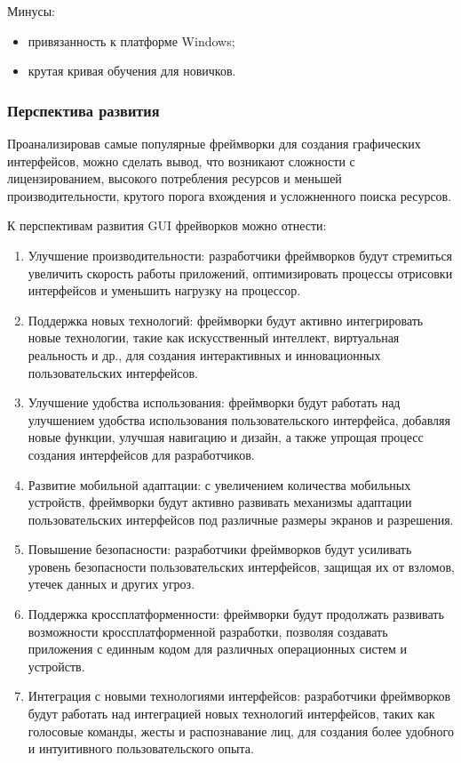 Минусы:
\begin{itemize}
\item привязанность к платформе Windows;
\item крутая кривая обучения для новичков.
\end{itemize}

\subsubsection {Перспектива развития}
Проанализировав самые популярные фреймворки для создания графических интерфейсов, можно сделать вывод, что возникают сложности с лицензированием, высокого потребления ресурсов и меньшей производительности, крутого порога вхождения и усложненного поиска ресурсов.

К перспективам развития GUI фрейворков можно отнести:
\begin{enumerate}
\item Улучшение производительности: разработчики фреймворков будут стремиться увеличить скорость работы приложений, оптимизировать процессы отрисовки интерфейсов и уменьшить нагрузку на процессор.
\item Поддержка новых технологий: фреймворки будут активно интегрировать новые технологии, такие как искусственный интеллект, виртуальная реальность и др., для создания интерактивных и инновационных пользовательских интерфейсов.
\item Улучшение удобства использования: фреймворки будут работать над улучшением удобства использования пользовательского интерфейса, добавляя новые функции, улучшая навигацию и дизайн, а также упрощая процесс создания интерфейсов для разработчиков.
\item Развитие мобильной адаптации: с увеличением количества мобильных устройств, фреймворки будут активно развивать механизмы адаптации пользовательских интерфейсов под различные размеры экранов и разрешения.
\item Повышение безопасности: разработчики фреймворков будут усиливать уровень безопасности пользовательских интерфейсов, защищая их от взломов, утечек данных и других угроз.
\item Поддержка кроссплатформенности: фреймворки будут продолжать развивать возможности кроссплатформенной разработки, позволяя создавать приложения с единным кодом для различных операционных систем и устройств.
\item Интеграция с новыми технологиями интерфейсов: разработчики фреймворков будут работать над интеграцией новых технологий интерфейсов, таких как голосовые команды, жесты и распознавание лиц, для создания более удобного и интуитивного пользовательского опыта.
\end{enumerate}
